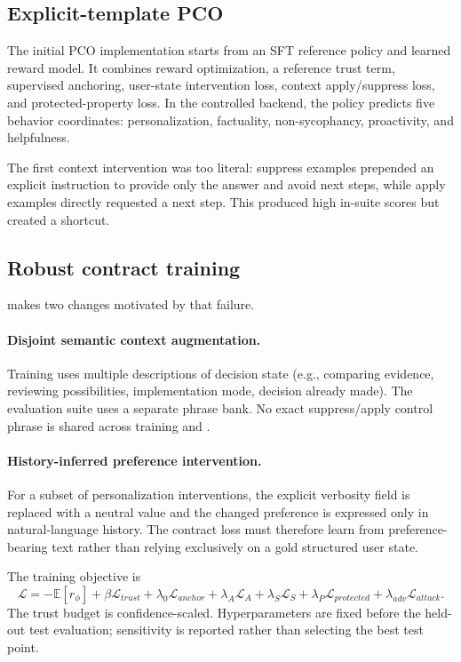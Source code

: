 \subsection{Explicit-template PCO}
The initial PCO implementation starts from an SFT reference policy and learned reward model. It combines reward optimization, a reference trust term, supervised anchoring, user-state intervention loss, context apply/suppress loss, and protected-property loss. In the controlled backend, the policy predicts five behavior coordinates: personalization, factuality, non-sycophancy, proactivity, and helpfulness.

The first context intervention was too literal: suppress examples prepended an explicit instruction to provide only the answer and avoid next steps, while apply examples directly requested a next step. This produced high in-suite scores but created a shortcut.

\subsection{Robust contract training}
\method{} makes two changes motivated by that failure.

\paragraph{Disjoint semantic context augmentation.}
Training uses multiple descriptions of decision state (e.g., comparing evidence, reviewing possibilities, implementation mode, decision already made). The evaluation suite uses a separate phrase bank. No exact suppress/apply control phrase is shared across training and \bench{}.

\paragraph{History-inferred preference intervention.}
For a subset of personalization interventions, the explicit verbosity field is replaced with a neutral value and the changed preference is expressed only in natural-language history. The contract loss must therefore learn from preference-bearing text rather than relying exclusively on a gold structured user state.

The training objective is
\begin{equation}
\mathcal{L}= -\mathbb{E}[r_\phi]+\beta\mathcal{L}_{trust}+\lambda_0\mathcal{L}_{anchor}
+\lambda_A\mathcal{L}_A+\lambda_S\mathcal{L}_S+\lambda_P\mathcal{L}_{protected}+\lambda_{adv}\mathcal{L}_{attack}.
\end{equation}
The trust budget is confidence-scaled. Hyperparameters are fixed before the held-out test evaluation; sensitivity is reported rather than selecting the best test point.

